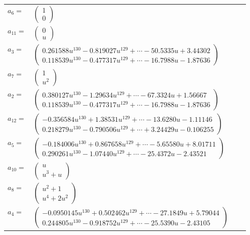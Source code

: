 \documentclass[1p]{elsarticle_modified}
\theoremstyle{definition}
\begin{document}
\begin{tabular}{m{7pt} m{180pt} m{7pt} m{180pt} }
\flushright $a_{6}=$&$\begin{pmatrix}1\\0\end{pmatrix}$ \\
\flushright $a_{11}=$&$\begin{pmatrix}0\\u\end{pmatrix}$ \\
\flushright $a_{3}=$&$\begin{pmatrix}0.261588 u^{130}-0.819027 u^{129}+\cdots-50.5335 u+3.44302\\0.118539 u^{130}-0.477317 u^{129}+\cdots-16.7988 u-1.87636\end{pmatrix}$ \\
\flushright $a_{7}=$&$\begin{pmatrix}1\\u^2\end{pmatrix}$ \\
\flushright $a_{2}=$&$\begin{pmatrix}0.380127 u^{130}-1.29634 u^{129}+\cdots-67.3324 u+1.56667\\0.118539 u^{130}-0.477317 u^{129}+\cdots-16.7988 u-1.87636\end{pmatrix}$ \\
\flushright $a_{12}=$&$\begin{pmatrix}-0.356584 u^{130}+1.38531 u^{129}+\cdots-13.6280 u-1.11146\\0.218279 u^{130}-0.790506 u^{129}+\cdots+3.24429 u-0.106255\end{pmatrix}$ \\
\flushright $a_{5}=$&$\begin{pmatrix}-0.184006 u^{130}+0.867658 u^{129}+\cdots-5.65580 u+8.01711\\0.290261 u^{130}-1.07440 u^{129}+\cdots-25.4372 u-2.43521\end{pmatrix}$ \\
\flushright $a_{10}=$&$\begin{pmatrix}u\\u^3+u\end{pmatrix}$ \\
\flushright $a_{8}=$&$\begin{pmatrix}u^2+1\\u^4+2 u^2\end{pmatrix}$ \\
\flushright $a_{4}=$&$\begin{pmatrix}-0.0950145 u^{130}+0.502462 u^{129}+\cdots-27.1849 u+5.79044\\0.244805 u^{130}-0.918752 u^{129}+\cdots-25.5390 u-2.43105\end{pmatrix}$ \\

\end{tabular}
\end{document}
